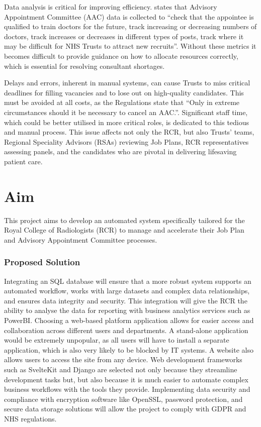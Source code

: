 Data analysis is critical for improving efficiency. \textcite{the_royal_college_of_radiologists_advisory_2024-1} states that Advisory Appointment Committee (AAC) data is collected to “check that the appointee is qualified to train doctors for the future, track increasing or decreasing numbers of doctors, track increases or decreases in different types of posts, track where it may be difficult for NHS Trusts to attract new recruits”. Without these metrics it becomes difficult to provide guidance on how to allocate resources correctly, which is essential for resolving consultant shortages.

Delays and errors, inherent in manual systems, can cause Trusts to miss critical deadlines for filling vacancies and to lose out on high-quality candidates. This must be avoided at all costs, as the \textcite{national_health_service_appointment_of_consultants_national_2005} Regulations state that “Only in extreme circumstances should it be necessary to cancel an AAC.”. Significant staff time, which could be better utilised in more critical roles, is dedicated to this tedious and manual process. This issue affects not only the RCR, but also Trusts’ teams, Regional Speciality Advisors (RSAs) reviewing Job Plans, RCR representatives assessing panels, and the candidates who are pivotal in delivering lifesaving patient care.
\section{Aim} \label{Aim}
This project aims to develop an automated system specifically tailored for the Royal College of Radiologists (RCR) to manage and accelerate their Job Plan and Advisory Appointment Committee processes. 

\subsubsection{Proposed Solution}
Integrating an SQL database will ensure that a more robust system supports an automated workflow, works with large datasets and complex data relationships, and ensures data integrity and security. This integration will give the RCR the ability to analyse the data for reporting with business analytics services such as PowerBI. Choosing a web-based platform application allows for easier access and collaboration across different users and departments. A stand-alone application would be extremely unpopular, as all users will have to install a separate application, which is also very likely to be blocked by IT systems. A website also allows users to access the site from any device. Web development frameworks such as SvelteKit and Django are selected not only because they streamline development tasks but, but also because it is much easier to automate complex business workflows with the tools they provide. Implementing data security and compliance with encryption software like OpenSSL, password protection, and secure data storage solutions will allow the project to comply with GDPR and NHS regulations. 

